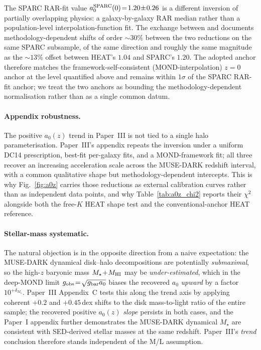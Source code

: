 \documentclass[twocolumn,letterpaper]{aastex631}
\newcommand{\azero}{a_0}
\begin{document}
The SPARC RAR-fit value
$\azero^{\rm SPARC}(0)\!=\!1.20\!\pm\!0.26$ is a different
inversion of partially overlapping physics: a galaxy-by-galaxy
RAR median rather than a population-level interpolation-function
fit.  The exchange between \citet{Rodrigues2018} and
\citet{McGaugh2018} documents methodology-dependent shifts of
order $\sim 30\%$ between the two reductions on the same SPARC
subsample, of the same
direction and roughly the same magnitude as the
$\sim 13\%$ offset between HEAT's $1.04$ and SPARC's $1.20$.
The adopted anchor therefore matches the framework-self-consistent
(MOND-interpolation) $z\!=\!0$ anchor at the level
quantified above and remains within $1\sigma$ of the SPARC RAR-fit
anchor; we treat the two anchors as bounding the
methodology-dependent normalisation rather than as a single
common datum.

\paragraph{Appendix robustness.}  The positive $\azero(z)$
trend in Paper~III is not tied to a single halo
parameterisation.  Paper~III's appendix repeats the inversion
under a uniform DC14 prescription, best-fit per-galaxy fits, and a
MOND-framework fit; all three recover an increasing acceleration
scale across the MUSE-DARK redshift interval, with a common
qualitative shape but methodology-dependent intercepts.  This
is why Fig.~\ref{fig:a0z} carries those reductions as external
calibration curves rather than as independent data points, and
why Table~\ref{tab:a0z_chi2} reports their $\chi^{2}$ alongside
both the free-$K$ HEAT shape test and the conventional-anchor
HEAT reference.

\paragraph{Stellar-mass systematic.}  The natural objection
\citep[discussed by][see also Paper~III \S\,4]{Ciocan2026RAR}
is in the opposite direction from a naive expectation: the
MUSE-DARK dynamical disk--halo decompositions are potentially
\emph{submaximal}, so the high-$z$ baryonic mass
$M_{\star}\!+\!M_{\rm HI}$ may be \emph{under-estimated}, which
in the deep-MOND limit
$g_{\rm obs}\!=\!\sqrt{g_{\rm bar}\azero}$ biases the recovered
$\azero$ \emph{upward} by a factor
$10^{+\delta_{M_{\star}}}$.  Paper~III Appendix~C tests this
along the trend axis by applying coherent $+0.2$ and $+0.45$\,dex
shifts to the disk mass-to-light ratio of the entire sample;
the recovered positive $\azero(z)$ \emph{slope} persists in both
cases, and the Paper~I appendix further demonstrates the
MUSE-DARK dynamical $M_{\star}$ are consistent with
SED-derived stellar masses at the same redshift.  Paper~III's
\emph{trend} conclusion therefore stands independent of the
M/L assumption.
\end{document}

